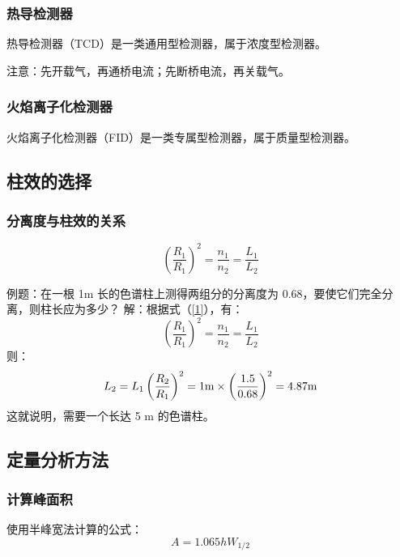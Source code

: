 \documentclass[UTF8,AutoFakeBold,b5paper]{ctexbook}
\begin{document}
\subsubsection{热导检测器}
热导检测器（TCD）是一类\textcolor[rgb]{0.54,0.13,0.33}{通用型检测器}，属于浓度型检测器。

\textcolor[rgb]{0.56,0.28,0.16}{注意：先开载气，再通桥电流；先断桥电流，再关载气。}
\subsubsection{火焰离子化检测器}
火焰离子化检测器（FID）是一类\textcolor[rgb]{0.54,0.13,0.33}{专属型检测器}，属于质量型检测器。

\subsection{柱效的选择}
\subsubsection{分离度与柱效的关系}
\begin{equation}
	\left( \dfrac{R_{1}}{R_{1}} \right)^{2} = \dfrac{n_{1}}{n_{2}} = \dfrac{L_{1}}{L_{2}}
	\label{1}
\end{equation}

{\fangsong 
\textcolor[rgb]{0.07,0.36,0.57}{例题：在一根 1m 长的色谱柱上测得两组分的分离度为 0.68，要使它们完全分离，则柱长应为多少？}
\textcolor[rgb]{0.54,0.13,0.33}{解：根据式（\textcolor[rgb]{0.54,0.13,0.33}{\ref{1}}），有：
\begin{equation}
	\left( \dfrac{R_{1}}{R_{1}} \right)^{2} = \dfrac{n_{1}}{n_{2}} = \dfrac{L_{1}}{L_{2}}
\end{equation}则：
\begin{equation}
	L_{2} = L_{1} \left( \dfrac{R_{2}}{R_{1}} \right)^{2} = 1\ce{m} \times \left( \dfrac{1.5}{0.68} \right)^{2} =4.87\ce{m}
\end{equation}
这就说明，需要一个长达 5 m 的色谱柱。
}
}

\subsection{定量分析方法}
\subsubsection{计算峰面积}
使用半峰宽法计算的公式：
\begin{equation}
	A = 1.065hW_{1/2}
\end{equation}
\end{document}
